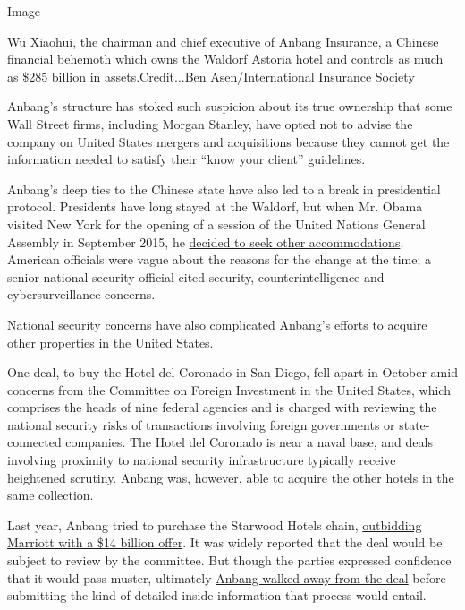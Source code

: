 Image

Wu Xiaohui, the chairman and chief executive of Anbang Insurance, a
Chinese financial behemoth which owns the Waldorf Astoria hotel and
controls as much as \$285 billion in assets.Credit...Ben
Asen/International Insurance Society

Anbang's structure has stoked such suspicion about its true ownership
that some Wall Street firms, including Morgan Stanley, have opted not to
advise the company on United States mergers and acquisitions because
they cannot get the information needed to satisfy their ``know your
client'' guidelines.

Anbang's deep ties to the Chinese state have also led to a break in
presidential protocol. Presidents have long stayed at the Waldorf, but
when Mr. Obama visited New York for the opening of a session of the
United Nations General Assembly in September 2015, he
\href{https://www.nytimes.com/2015/09/12/us/politics/white-house-spurns-waldorf-astoria-out-of-security-concerns.html}{decided
to seek other accommodations}. American officials were vague about the
reasons for the change at the time; a senior national security official
cited security, counterintelligence and cybersurveillance concerns.

National security concerns have also complicated Anbang's efforts to
acquire other properties in the United States.

One deal, to buy the Hotel del Coronado in San Diego, fell apart in
October amid concerns from the Committee on Foreign Investment in the
United States, which comprises the heads of nine federal agencies and is
charged with reviewing the national security risks of transactions
involving foreign governments or state-connected companies. The Hotel
del Coronado is near a naval base, and deals involving proximity to
national security infrastructure typically receive heightened scrutiny.
Anbang was, however, able to acquire the other hotels in the same
collection.

Last year, Anbang tried to purchase the Starwood Hotels chain,
\href{https://www.nytimes.com/2016/03/29/business/dealbook/starwood-bidding-war-increases-with-higher-offer.html}{outbidding
Marriott with a \$14 billion offer}. It was widely reported that the
deal would be subject to review by the committee. But though the parties
expressed confidence that it would pass muster, ultimately
\href{https://www.nytimes.com/2016/04/01/business/dealbook/starwood-hotels-chinese-suitor-backs-out-of-bidding.html}{Anbang
walked away from the deal} before submitting the kind of detailed inside
information that process would entail.

